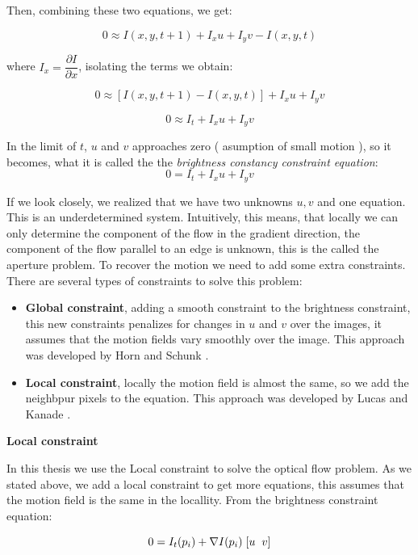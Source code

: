 \documentclass[12pt, a4paper, titlepage,twoside,openright]{article}
\begin{document}
Then, combining these two equations, we get:

$$ 0 	\approx  I(x,y,t+1) + I_{x}u +I_{y}v - I(x,y,t) $$

where $I_{x} =  \dfrac{ \partial I}{\partial x}$, isolating the terms we obtain:

$$ 0 	\approx [I(x,y,t+1) - I(x,y,t)] + I_{x}u +I_{y}v $$

$$ 0 	\approx I_{t} + I_{x}u +I_{y}v $$

In the limit of $t$, $u$ and $v$ approaches zero ( asumption of small motion ), so it becomes, what it is called the the \textit{brightness constancy constraint equation}:
$$ 0 	= I_{t} + I_{x}u +I_{y}v $$

If we look closely, we realized that we have two unknowns $u,v$ and one equation. This is an underdetermined system. Intuitively, this means, that locally we can only determine the component of the flow in the gradient direction, the component of the flow parallel to an edge is unknown, this is the called the aperture problem. To recover the motion we need to add some extra constraints. There are several types of constraints to solve this problem:

\begin{itemize}

\item \textbf{Global constraint}, adding a smooth constraint to the brightness constraint, this new constraints penalizes for changes in $u$ and $v$ over the images, it assumes that the motion fields vary smoothly over the image. This approach was developed by Horn and Schunk \cite{horn}.

\item \textbf{Local constraint}, locally the motion field is almost the same, so we add the neighbpur pixels to the equation. This approach was developed by Lucas and Kanade \cite{LucasKana}.
\end{itemize}



\textbf{Local constraint}

In this thesis we use the Local constraint to solve the optical flow problem. As we stated above, we add a local constraint to get more equations, this assumes that the motion field is the same in the locallity. From the brightness constraint equation:

$$ 0 = I_{t}(p_{i}) + \nabla I(p_{i}) \hspace{0.1cm} [u \hspace{0.2cm} v]$$
\end{document}
